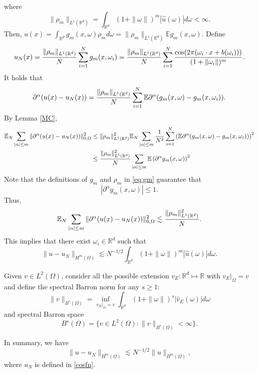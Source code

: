 where
$$
\| \rho_m\|_{L^1(\mathbb R^d)}=\int_{\mathbb R^d} (1+ \|\omega\|)^m|\hat u(\omega) | d\omega<\infty.
$$
Then, $\displaystyle u(x)=\int_{\mathbb R^d} g_m(x,\omega)\rho_m d\omega = \| \rho_m\|_{L^1(\mathbb R^d)}\mathbb{E}g_m(x,\omega)$. Define
\begin{equation}
u_N(x) = {\|\rho_m\|_{L^1(\mathbb R^d)}\over N} \sum_{i=1}^N g_m(x,\omega_i)
= {\|\rho_m\|_{L^1(\mathbb R^d)}\over N} \sum_{i=1}^N {\cos (2\pi(\omega_i\cdot x + b(\omega_i)))\over (1+\|\omega_i\|)^m}.
\end{equation}
It holds that 
$$
\partial^\alpha (u(x) - u_N(x))={\|\rho_m\|_{L^1(\mathbb R^d)}\over N}\sum_{i=1}^N \mathbb{E} \partial^\alpha (g_m(x,\omega) -  g_m(x,\omega_i)).
$$
By Lemma \ref{MC},
\begin{align}
\mathbb{E}_N \sum_{|\alpha|\le m}\|\partial^\alpha (u(x) - u_N(x))\|_{0, \Omega}^2 
&\le 
\|\rho_m \|_{L^1(\mathbb R^d)}^2\mathbb{E}_N \sum_{|\alpha|\le m}\frac{1}{N^2}\sum_{i=1}^N \left (\mathbb{E} \partial^\alpha (g_m(x,\omega) -  g_m(x,\omega_i))\right )^2
\\
&\le 
{\|\rho_m \|_{L^1(\mathbb R^d)}^2\over N}  \sum_{|\alpha|\le m}\mathbb{E} \left (\partial^\alpha g_m(x,\omega)\right)^2
\end{align}
Note that the definitions of $g_m$ and $\rho_m$ in \eqref{eq:gm} guarantee that 
$$
|\partial^\alpha g_m(x,\omega)|\le 1.
$$
Thus,
$$
\mathbb{E}_N \sum_{|\alpha|\le m}\|\partial^\alpha (u(x) - u_N(x))\|_{0, \Omega}^2 \lesssim {\|\rho_m \|_{L^1(\mathbb R^d)}^2\over N}.
$$
This implies that there exist
$\omega_i\in \mathbb R^d$ such that
\begin{equation}
\label{cosHm}
\|u-u_N\|_{H^m(\Omega)}\lesssim N^{-1/2}\int_{\mathbb{R}^d} (1+ \|\omega\|)^m|\hat u(\omega) | d\omega.  
\end{equation}


Given $v\in L^2(\Omega)$,   consider all the possible extension $v_E:
\mathbb{R}^d \mapsto \mathbb{R}$ with $v_E |_{\Omega} = v$ and define
the spectral  Barron norm for any $s\ge 1$:
	\begin{equation}\label{barron-norm0}
	\|v\|_{B^{s}(\Omega)} = \inf_{v_E |_{\Omega} = v} \int_{\mathbb{R}^d}(1+\|\omega\|)^s|\hat{v}_E(\omega)|d\omega
	\end{equation}
and  spectral  Barron space
\begin{equation}
  \label{Barron}
	B^{s}(\Omega) = \{v\in L^2(\Omega): \|v\|_{B^{s}(\Omega)}<\infty\}.  
\end{equation}

In summary, we have 
\begin{equation} 
\|u-u_N\|_{H^m(\Omega)}\lesssim N^{-1/2}  \|u\|_{B^{m}(\Omega)},
\end{equation}
where $u_N$ is defined in \eqref{cosfn}.


